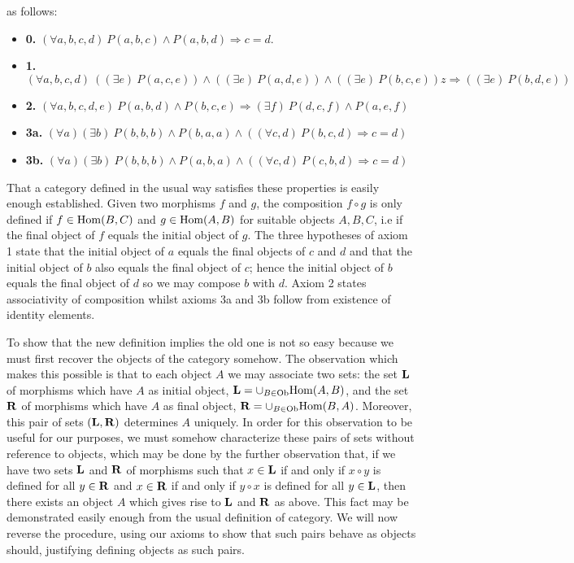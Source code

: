\documentclass[12pt]{article}
\begin{document}
as follows:
\begin{itemize}
 \item{\bf 0.} $(\forall a,b,c,d) ~ P(a,b,c) \land P(a,b,d) \Rightarrow
  c = d$.
 \item{\bf 1.} $(\forall a,b,c,d) ~ ((\exists e)~P(a,c,e)) \land 
  ((\exists e)~P(a,d,e)) \land
  ((\exists e)~P(b,c,e))z \Rightarrow ((\exists e)~P(b,d,e))$
 \item{\bf 2.} $(\forall a,b,c,d,e) ~ P(a,b,d) \land P(b,c,e)
  \Rightarrow (\exists f) ~ P(d,c,f) \land P(a,e,f)$
 \item{\bf 3a.} $(\forall a) (\exists b) ~ P(b,b,b) \land P(b,a,a)
  \land ((\forall c,d) ~ P(b,c,d) \Rightarrow c = d)$
 \item{\bf 3b.} $(\forall a) (\exists b) ~ P(b,b,b) \land P(a,b,a)
  \land ((\forall c,d) ~ P(c,b,d) \Rightarrow c = d)$
\end{itemize}

That a category defined in the usual way satisfies these properties 
is easily enough established.  Given two morphisms $f$ and $g$,
the composition $f \circ g$ is only defined if $f \in {\rm Hom} (B,C)$
and $g \in {\rm Hom} (A,B)$ for suitable objects $A,B,C$, i.e if the
final object of $f$ equals the initial object of $g$.  The three
hypotheses of axiom 1 state that the initial object of $a$ equals the
final objects of $c$ and $d$ and that the initial object of $b$ also
equals the final object of $c$; hence the initial object of $b$ equals
the final object of $d$ so we may compose $b$ with $d$.
Axiom 2 states associativity of composition whilst axioms 3a and 3b
follow from existence of identity elements.

To show that the new definition implies the old one is not so easy
because we must first recover the objects of the category somehow.
The observation which makes this possible is that to each object $A$
we may associate two sets: the set ${\bf L}$ of morphisms which have
$A$ as initial object, ${\bf L} = \cup_{B \in {\rm Ob}} {\rm Hom} (A,B)$,
and the set ${\bf R}$ of morphisms which have $A$ as final object, 
${\bf R} = \cup_{B \in {\rm Ob}} {\rm Hom} (B,A)$.  Moreover, this
pair of sets $({\bf L},{\bf R})$ determines $A$ uniquely.  In order
for this observation to be useful for our purposes, we must somehow
characterize these pairs of sets without reference to objects, which
may be done by the further observation that, if we have two sets ${\bf L}$ 
and ${\bf R}$ of morphisms such that $x \in {\bf L}$ if and only if 
$x \circ y$ is defined for all $y \in {\bf R}$ and $x \in {\bf R}$ if 
and only if $y \circ x$ is defined for all $y \in {\bf L}$, then there 
exists an object $A$ which gives rise to ${\bf L}$ and ${\bf R}$ as above.  
This fact may be demonstrated easily enough from the usual definition of
category.  We will now reverse the procedure, using our axioms to show
that such pairs behave as objects should, justifying defining objects
as such pairs.
\end{document}
